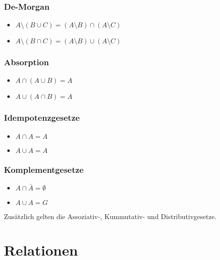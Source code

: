 \documentclass[10pt,a4paper,twoside,twocolumn]{article}
\begin{document}
	\subsubsection{De-Morgan}
	
	\begin{itemize}
		\setlength\itemsep{0em}
		\item $ A \setminus (B \cup C) = (A \setminus B) \cap (A \setminus C) $
		\item $ A \setminus (B \cap C) = (A \setminus B) \cup (A \setminus C) $
	\end{itemize}

	\subsubsection{Absorption}
	
	\begin{itemize}
		\setlength\itemsep{0em}
		\item $ A \cap (A \cup B) = A $
		\item $ A \cup (A \cap B) = A $
	\end{itemize}

	\subsubsection{Idempotenzgesetze}
	
	\begin{itemize}
		\setlength\itemsep{0em}
		\item $ A \cap A = A $
		\item $ A \cup A = A $
	\end{itemize}

	\subsubsection{Komplementgesetze}
	
	\begin{itemize}
		\setlength\itemsep{0em}
		\item $ A \cap \bar{A} = \emptyset $
		\item $ A \cup A = G $
	\end{itemize}

	Zusätzlich gelten die Assoziativ-, Kummutativ- und Distributivgesetze.

	\section{Relationen}
	
\end{document}
